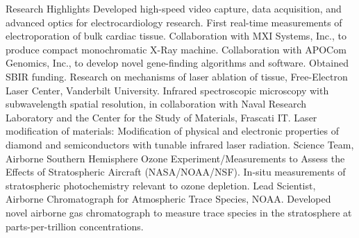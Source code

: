 \begin{rubric}{Research Highlights}%
\entry*[2000--2004]Developed high-speed video capture, data acquisition, and advanced optics for electrocardiology research. First real-time measurements of electroporation of bulk cardiac tissue.
\entry*[2001--2002]Collaboration with MXI Systems, Inc., to produce compact monochromatic X-Ray machine.
\entry*[1999--2002]Collaboration with APOCom Genomics, Inc., to develop novel gene-finding algorithms and software. Obtained SBIR funding.
\entry*[1999--2000]Research on mechanisms of laser ablation of tissue, Free-Electron Laser Center, Vanderbilt University.
\entry*[1996--2002]Infrared spectroscopic microscopy with subwavelength spatial resolution, in collaboration with Naval Research Laboratory and the Center for the Study of Materials, Frascati IT.
\entry*[1996--1999]Laser modification of materials: Modification of physical and electronic properties of diamond and semiconductors with tunable infrared laser radiation.
\entry*[1993--1994]Science Team, Airborne Southern Hemisphere Ozone Experiment/Measurements to Assess the Effects of Stratospheric Aircraft (NASA/NOAA/NSF). In-situ measurements of stratospheric photochemistry relevant to ozone depletion.
\entry*[1993--1994]Lead Scientist, Airborne Chromatograph for Atmospheric Trace Species, NOAA. Developed novel airborne gas chromatograph to measure trace species in the stratosphere at parts-per-trillion concentrations.
\end{rubric}
